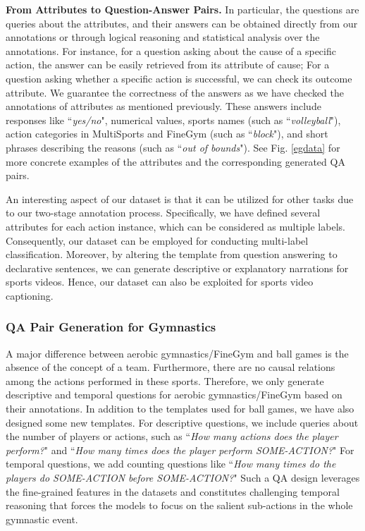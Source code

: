 {\noindent\textbf{From Attributes to Question-Answer Pairs.} In particular, the questions are queries about the attributes, and their answers can be obtained directly from our annotations or through logical reasoning and statistical analysis over the annotations. For instance, for a question asking about the cause of a specific action, the answer can be easily retrieved from its attribute of cause; For a question asking whether a specific action is successful, we can check its outcome attribute. We guarantee the correctness of the answers as we have checked the annotations of attributes as mentioned previously.
These answers include responses like ``\textit{yes/no}", numerical values, sports names (such as ``\textit{volleyball}"), action categories in MultiSports and FineGym (such as ``\textit{block}"), and short phrases describing the reasons (such as ``\textit{out of bounds}"). See Fig. \ref{egdata} for more concrete examples of the attributes and the corresponding generated QA pairs. 






An interesting aspect of our dataset is that it can be utilized for other tasks due to our two-stage annotation process. Specifically, we have defined several attributes for each action instance, which can be considered as multiple labels. Consequently, our dataset can be employed for conducting multi-label classification.
Moreover, by altering the template from question answering to declarative sentences, we can generate descriptive or explanatory narrations for sports videos. Hence, our dataset can also be exploited for sports video captioning.

\subsubsection{QA Pair Generation for Gymnastics}

A major difference between aerobic gymnastics/FineGym and ball games is the absence of the concept of a team. Furthermore, there are no causal relations among the actions performed in these sports. Therefore, we only generate descriptive and temporal questions for aerobic gymnastics/FineGym based on their annotations. In addition to the templates used for ball games, we have also designed some new templates. For descriptive questions, we include queries about the number of players or actions, such as ``\textit{How many actions does the player perform?}" and ``\textit{How many times does the player perform SOME-ACTION?}" For temporal questions, we add counting questions like ``\textit{How many times do the players do SOME-ACTION before SOME-ACTION?}" Such a QA design leverages the fine-grained features in the datasets and constitutes challenging temporal reasoning that forces the models to focus on the salient sub-actions in the whole gymnastic event.






}
